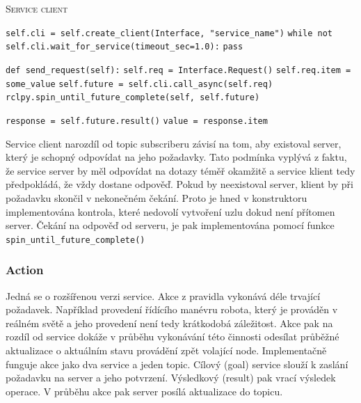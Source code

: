 \begin{algorithm}[h!]
	\label{}
	\caption{\textsc{Service client}}
	
	\DontPrintSemicolon
	\SetAlgoNoLine
	\SetNlSty{}{}{:}
	\SetNlSkip{-1.1em}
	
	\BlankLine \Indp\Indpp
	
	\texttt{self.cli = self.create\_client(Interface, "service\_name")}\;
	\texttt{while not self.cli.wait\_for\_service(timeout\_sec=1.0):}\;
	\Indp\Indp
	\texttt{pass}\;
	\Indm\Indm

	\BlankLine
	\texttt{def send\_request(self):}\;
	\Indp\Indp
	\texttt{self.req = Interface.Request()}\;
	\texttt{self.req.item = some\_value}\;
	\texttt{self.future = self.cli.call\_async(self.req)}\;
	\texttt{rclpy.spin\_until\_future\_complete(self, self.future)}\;
	
	\BlankLine
	\texttt{response = self.future.result()}\;
	\texttt{value = response.item}\;
\end{algorithm}
Service client narozdíl od topic subscriberu závisí na tom, aby existoval server, který je schopný odpovídat na jeho požadavky. Tato podmínka vyplývá z faktu, že service server by měl odpovídat na dotazy téměř okamžitě a service klient tedy předpokládá, že vždy dostane odpověď. Pokud by neexistoval server, klient by při požadavku skončil v nekonečném čekání. Proto je hned v konstruktoru implementována kontrola, které nedovolí vytvoření uzlu dokud není přítomen server. Čekání na odpověď od serveru, je pak implementována pomocí funkce \verb|spin_until_future_complete()|

\subsubsection*{Action} %
Jedná se o rozšířenou verzi service. Akce z pravidla vykonává déle trvající požadavek. Například provedení řídícího manévru robota, který je prováděn v reálném světě a jeho provedení není tedy krátkodobá záležitost. Akce pak na rozdíl od service dokáže v průběhu vykonávání této činnosti odesílat průběžné aktualizace o aktuálním stavu provádění zpět volající node. Implementačně funguje akce jako dva service a jeden topic. Cílový (goal) service slouží k zaslání požadavku na server a jeho potvrzení. Výsledkový (result) pak vrací výsledek operace. V průběhu akce pak server posílá aktualizace do topicu.

